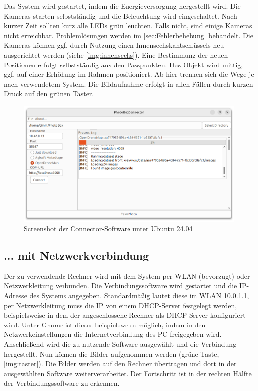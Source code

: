 \documentclass[./00PhotoBox.tex]{subfiles}
\begin{document}
Das System wird gestartet, indem die Energieversorgung hergestellt wird. Die Kameras starten selbstständig und die Beleuchtung wird eingeschaltet. Nach kurzer Zeit sollten kurz alle LEDs grün leuchten. Falls nicht, sind einige Kameras nicht erreichbar. Problemlösungen werden im \autoref{sec:Fehlerbehebung} behandelt. Die Kameras können ggf. durch Nutzung einen Innensechskantschlüssels neu ausgerichtet werden (siehe \autoref{img:innensechs}). Eine Bestimmung der neuen Positionen erfolgt selbstständig aus den Passpunkten. Das Objekt wird mittig, ggf. auf einer Erhöhung im Rahmen positioniert. Ab hier trennen sich die Wege je nach verwendetem System. Die Bildaufnahme erfolgt in allen Fällen durch kurzen Druck auf den grünen Taster.

\begin{figure}[htbp]
    \centering
    \includegraphics[width=1\textwidth]{./img/5_software/connector_screenshot.png}
    \caption{Screenshot der Connector-Software unter Ubuntu 24.04}
    \label{img:connector}
\end{figure}

\subsection{... mit Netzwerkverbindung}
Der zu verwendende Rechner wird mit dem System per WLAN (bevorzugt) oder Netzwerkleitung verbunden. Die Verbindungssoftware wird gestartet und die IP-Adresse des Systems angegeben. Standardmäßig lautet diese im WLAN 10.0.1.1, per Netzwerkleitung muss die IP von einem DHCP-Server festgelegt werden, beispielsweise in dem der angeschlossene Rechner als DHCP-Server konfiguriert wird. Unter Gnome ist dieses beispielsweise möglich, indem in den Netzwerkeinstellungen die Internetverbindung des PC freigegeben wird.
Anschließend wird die zu nutzende Software ausgewählt und die Verbindung hergestellt.
Nun können die Bilder aufgenommen werden (grüne Taste, \autoref{img:taster}). Die Bilder werden auf den Rechner übertragen und dort in der ausgewählten Software weiterverarbeitet. Der Fortschritt ist in der rechten Hälfte der Verbindungssoftware zu erkennen.
\end{document}
